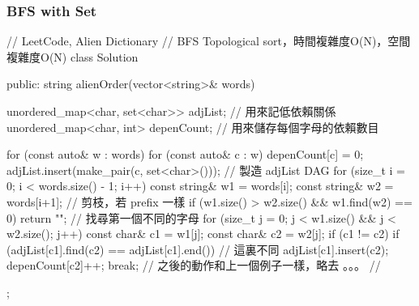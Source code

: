 \subsubsection{BFS with Set}
\begin{Code}
// LeetCode, Alien Dictionary
// BFS Topological sort，時間複雜度O(N)，空間複雜度O(N)
class Solution {
public:
    string alienOrder(vector<string>& words) {
        unordered_map<char, set<char>> adjList; // 用來記低依賴關係
        unordered_map<char, int> depenCount; // 用來儲存每個字母的依賴數目

        for (const auto& w : words)
            for (const auto& c : w)
            {
                depenCount[c] = 0;
                adjList.insert(make_pair(c, set<char>()));
            }
        // 製造 adjList DAG
        for (size_t i = 0; i < words.size() - 1; i++)
        {
            const string& w1 = words[i];
            const string& w2 = words[i+1];
            // 剪枝，若 prefix 一樣
            if (w1.size() > w2.size() && w1.find(w2) == 0) return "";
            // 找尋第一個不同的字母
            for (size_t j = 0; j < w1.size() && j < w2.size(); j++)
            {
                const char& c1 = w1[j];
                const char& c2 = w2[j];
                if (c1 != c2)
                {
                    if (adjList[c1].find(c2) == adjList[c1].end()) // 這裏不同
                    {
                        adjList[c1].insert(c2);
                        depenCount[c2]++;
                    }
                    break;
                }
            }
        }
        // 之後的動作和上一個例子一樣，略去 。。。 //
    }
};

\end{Code}

